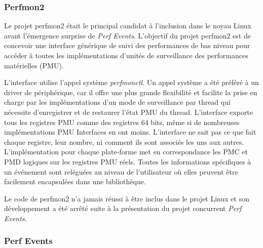     
        \subsubsection{Perfmon2}
            Le projet perfmon2 était le principal candidat à l'inclusion dans le noyau Linux avant l'émergence surprise de \textit{Perf Events}. L'objectif du projet perfmon2 est de concevoir une interface générique de suivi des performances de bas niveau pour accéder à toutes les implémentations d'unités de surveillance des performances matérielles (PMU).
            
            L'interface utilise l'appel système \textit{perfmonctl}. Un appel système a été préféré à un driver de périphérique, car il offre une plus grande flexibilité et facilite la prise en charge par les implémentations d'un mode de surveillance par thread qui nécessite d'enregistrer et de restaurer l'état PMU du thread. L'interface exporte tous les registres PMU comme des registres 64 bits, même si de nombreuses implémentations PMU Interfaces en ont moins. L'interface ne sait pas ce que fait chaque registre, leur nombre, ni comment ils sont associés les uns aux autres. L'implémentation pour chaque plate-forme met en correspondance les PMC et PMD logiques sur les registres PMU réels. Toutes les informations spécifiques à un événement sont reléguées au niveau de l'utilisateur où elles peuvent être facilement encapsulées dans une bibliothèque.
        
            Le code de perfmon2 n'a jamais réussi à être inclus dans le projet Linux et son développement a été arrêté suite à la présentation du projet concurrent \textit{Perf Events}.
    
    
    
        \subsubsection{Perf Events}\label{sec:edl_profiling_perf}
        
